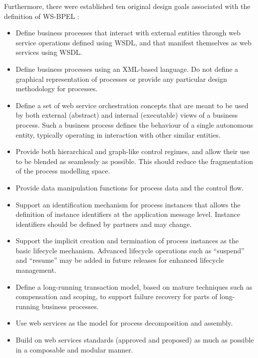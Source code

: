 Furthermore, there were established ten original design goals associated with the definition of WS-BPEL \cite{wsbpelstandard}:
\begin{itemize}
\item Define business processes that interact with external entities 
through web service operations defined using WSDL, and that 
manifest themselves as web services using WSDL. 
\item Define business processes using an XML-based language. 
Do not define a graphical representation of processes or provide any particular design methodology for processes.
\item Define a set of web service orchestration concepts that are meant to be used by both external (abstract) and internal (executable) views of a business process. Such a business process defines the behaviour of a single autonomous entity, typically operating in interaction with other similar entities. 
\item Provide both hierarchical and graph-like control regimes, and allow their use to be blended as seamlessly as possible. This should reduce the fragmentation of the process modelling space.
\item Provide data manipulation functions for process data and the control flow.
\item Support an identification mechanism for process instances that allows the definition of instance identifiers at the application message level. Instance identifiers should be defined by partners and may change.
\item Support the implicit creation and termination of process instances as the basic lifecycle mechanism. Advanced lifecycle operations such as ``suspend'' and ``resume'' may be added in future releases for enhanced lifecycle management.
\item Define a long-running transaction model, based on mature techniques such as compensation and scoping, to support failure recovery for parts of long-running business processes.
\item Use web services as the model for process decomposition and assembly.
\item  Build on web services standards (approved and proposed) as much as possible in a composable and modular manner.
\end{itemize}

